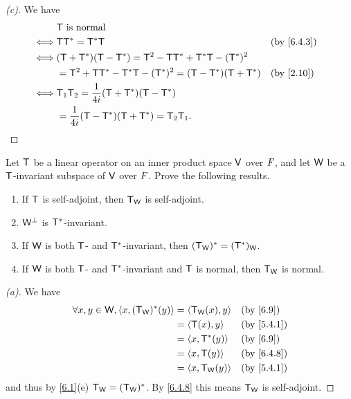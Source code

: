\begin{proof}[(c)]
  We have
  \begin{align*}
         & \T \text{ is normal}                                                                          \\
    \iff & \T \T^* = \T^* \T                                               &  & \text{(by \cref{6.4.3})} \\
    \iff & (\T + \T^*) (\T - \T^*) = \T^2 - \T \T^* + \T^* \T - (\T^*)^2                                 \\
         & = \T^2 + \T \T^* - \T^* \T - (\T^*)^2 = (\T - \T^*) (\T + \T^*) &  & \text{(by \cref{2.10})}  \\
    \iff & \T_1 \T_2 = \frac{1}{4i} (\T + \T^*) (\T - \T^*)                                              \\
         & = \frac{1}{4i} (\T - \T^*) (\T + \T^*) = \T_2 \T_1.
  \end{align*}
\end{proof}

\begin{ex}\label{ex:6.4.7}
  Let \(\mathsf{T}\) be a linear operator on an inner product space \(\mathsf{V}\) over \(\mathit{F}\), and let \(\mathsf{W}\) be a \(\mathsf{T}\)-invariant subspace of \(\mathsf{V}\) over \(\mathit{F}\).
  Prove the following results.
  \begin{enumerate}
    \item If \(\mathsf{T}\) is self-adjoint, then \(\mathsf{T}_{\mathsf{W}}\) is self-adjoint.
    \item \(\mathsf{W}^{\perp}\) is \(\mathsf{T}^*\)-invariant.
    \item If \(\mathsf{W}\) is both \(\mathsf{T}\)- and \(\mathsf{T}^*\)-invariant, then \((\mathsf{T}_{\mathsf{W}})^* = (\mathsf{T}^*)_{\mathsf{W}}\).
    \item If \(\mathsf{W}\) is both \(\mathsf{T}\)- and \(\mathsf{T}^*\)-invariant and \(\mathsf{T}\) is normal, then \(\mathsf{T}_{\mathsf{W}}\) is normal.
  \end{enumerate}
\end{ex}

\begin{proof}[(a)]
  We have
  \begin{align*}
    \forall x, y \in \W, \inn{x, (\T_{\W})^*(y)} & = \inn{\T_{\W}(x), y} &  & \text{(by \cref{6.9})}   \\
                                                 & = \inn{\T(x), y}      &  & \text{(by \cref{5.4.1})} \\
                                                 & = \inn{x, \T^*(y)}    &  & \text{(by \cref{6.9})}   \\
                                                 & = \inn{x, \T(y)}      &  & \text{(by \cref{6.4.8})} \\
                                                 & = \inn{x, \T_{\W}(y)} &  & \text{(by \cref{5.4.1})}
  \end{align*}
  and thus by \cref{6.1}(e) \(\mathsf{T}_{\mathsf{W}} = (\mathsf{T}_{\mathsf{W}})^*\).
  By \cref{6.4.8} this means \(\mathsf{T}_{\mathsf{W}}\) is self-adjoint.
\end{proof}

